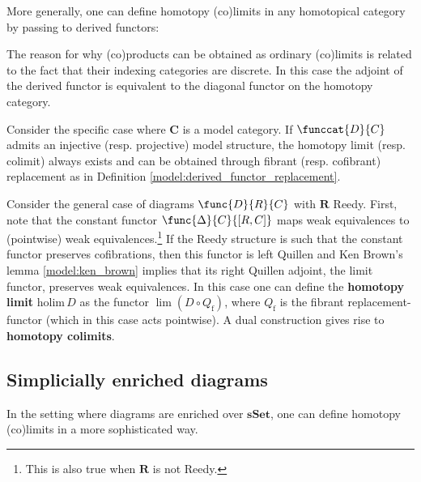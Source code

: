     More generally, one can define homotopy (co)limits in any homotopical category by passing to derived functors:
    \begin{remark}
        The reason for why (co)products can be obtained as ordinary (co)limits  is related to the fact that their indexing categories are discrete. In this case the adjoint of the derived functor is equivalent to the diagonal functor on the homotopy category.
    \end{remark}

    \begin{property}
        Consider the specific case where $\mathbf{C}$ is a model category. If $\funccat{D}{C}$ admits an injective (resp. projective) model structure, the homotopy limit (resp. colimit) always exists and can be obtained through fibrant (resp. cofibrant) replacement as in Definition \ref{model:derived_functor_replacement}.
    \end{property}
    \begin{example}
        Consider the general case of diagrams $\func{D}{R}{C}$ with $\mathbf{R}$ Reedy. First, note that the constant functor $\func{\Delta}{C}{[R,C]}$ maps weak equivalences to (pointwise) weak equivalences.\footnote{This is also true when $\mathbf{R}$ is not Reedy.} If the Reedy structure is such that the constant functor preserves cofibrations, then this functor is left Quillen and Ken Brown's lemma \ref{model:ken_brown} implies that its right Quillen adjoint, the limit functor, preserves weak equivalences. In this case one can define the \textbf{homotopy limit} $\mathrm{holim}\,D$ as the functor $\lim(D\circ Q_\mathrm{f})$, where $Q_\mathrm{f}$ is the fibrant replacement-functor (which in this case acts pointwise). A dual construction gives rise to \textbf{homotopy colimits}.
    \end{example}

\subsection{Simplicially enriched diagrams}

    In the setting where diagrams are enriched over $\mathbf{sSet}$, one can define homotopy (co)limits in a more sophisticated way.

